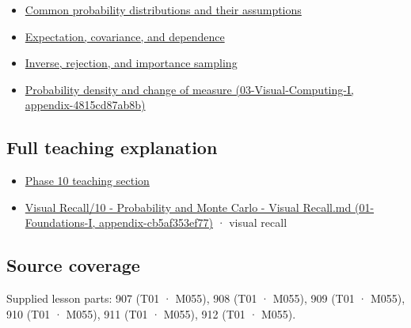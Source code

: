 \begin{itemize}
\tightlist
\item
  \hyperref[appendix-a2360b435383]{Common probability distributions and their assumptions}
\item
  \hyperref[appendix-54c383df9992]{Expectation, covariance, and dependence}
\item
  \hyperref[appendix-8d863ed954d0]{Inverse, rejection, and importance sampling}
\item
  \href{}{Probability density and change of measure (03-Visual-Computing-I, appendix-4815cd87ab8b)}
\end{itemize}

\subsection{Full teaching explanation}\label{full-teaching-explanation}

\begin{itemize}
\tightlist
\item
  \href{Continuous\%20Notes/Computing\%20Foundations\%20-\%20From\%20Bits\%20to\%20C++\%20and\%20Systems\%20APIs\#2.\%20Random\%20quantities\%20and\%20their\%20probability\%20laws}{Phase 10 teaching section}
\item
  \href{}{Visual Recall/10 - Probability and Monte Carlo - Visual Recall.md (01-Foundations-I, appendix-cb5af353ef77)} · visual recall
\end{itemize}

\subsection{Source coverage}\label{source-coverage}

Supplied lesson parts: 907 (T01 · M055), 908 (T01 · M055), 909 (T01 · M055), 910 (T01 · M055), 911 (T01 · M055), 912 (T01 · M055).
